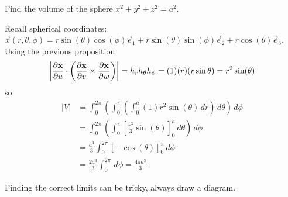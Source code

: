 \documentclass[10pt, a4paper]{article}
\begin{document}
\begin{example}
    Find the volume of the sphere $x ^ 2 + y ^ 2 + z ^ 2 = a ^ 2$.

    \begin{solution}
        Recall spherical coordinates:
        $\vec{x}(r, \theta, \phi) = r\sin(\theta)\cos(\phi)\vec{e}_1 + r\sin(\theta)\sin(\phi)\vec{e}_2 + r\cos(\theta)\vec{e}_3$.
        Using the previous proposition
        \[
        \left|\pd[\vec{x}]{u}\cdot\left(\pd[\vec{x}]{v} \times \pd[\vec{x}]{w}\right)\right| = h_rh_{\theta}h_{\phi} = (1)(r)(r\sin{\theta}) = r ^ 2\sin(\theta)
        \]
        so
        \begin{align*}
            |V| &= \int_{0}^{2\pi}\left(\int_{0}^{\pi}\left(\int_{0}^{a}(1)r ^ 2\sin(\theta)\,dr\right)\,d\theta\right)\,d\phi \\
            &= \int_{0}^{2\pi}\left(\int_{0}^{\pi}\left[\frac{r ^ 3}{3}\sin(\theta)\right]_{0}^{a}\,d\theta\right)\,d\phi \\
            &= \frac{a ^ 3}{3}\int_{0}^{2\pi}\left[-\cos(\theta)\right]_{0}^{\pi}\,d\phi \\
            &= \frac{2a ^ 3}{3}\int_{0}^{2\pi}\,d\phi = \frac{4\pi a ^ 3}{3}.
        \end{align*}
    \end{solution}
\end{example}

\begin{remark}
    Finding the correct limits can be tricky,
    always draw a diagram.
\end{remark}
\end{document}
